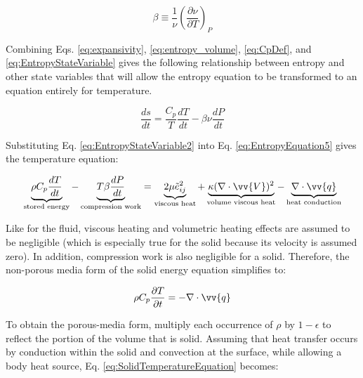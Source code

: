 \documentclass[10pt]{article}
\numberwithin{equation}{section} %
\begin{document}
\begin{equation}
\label{eq:expansivity}
\beta\equiv\frac{1}{\nu}\left(\frac{\partial \nu}{\partial T}\right)_P
\end{equation}

Combining Eqs. \eqref{eq:expansivity}, \eqref{eq:entropy_volume}, \eqref{eq:CpDef}, and \eqref{eq:EntropyStateVariable} gives the following relationship between entropy and other state variables that will allow the entropy equation to be transformed to an equation entirely for temperature.

\begin{equation}
\label{eq:EntropyStateVariable2}
\frac{ds}{dt}=\frac{C_p}{T}\frac{dT}{dt}-\beta \nu\frac{dP}{dt}
\end{equation}

Substituting Eq. \eqref{eq:EntropyStateVariable2} into Eq. \eqref{eq:EntropyEquation5} gives the temperature equation:

\begin{equation}
\label{eq:TemperatureEquation}
\begin{aligned}
\underbrace{\rho C_p\frac{dT}{dt}}_\text{stored energy}-\underbrace{T\beta\frac{dP}{dt}}_\text{compression work}=\underbrace{2\mu \tilde{e}_{ij}^2}_\text{viscous heat}+\underbrace{\kappa(\nabla\cdot\vv{V})^2}_\text{volume viscous heat}-\underbrace{\nabla\cdot\vv{q}}_\text{heat conduction}\\
\end{aligned}
\end{equation}

Like for the fluid, viscous heating and volumetric heating effects are assumed to be negligible (which is especially true for the solid because its velocity is assumed zero). In addition, compression work is also negligible for a solid. Therefore, the non-porous media form of the solid energy equation simplifies to:

\begin{equation}
\label{eq:SolidTemperatureEquation}
\rho C_p\frac{\partial T}{\partial t}=-\nabla\cdot\vv{q}\\
\end{equation}

To obtain the porous-media form, multiply each occurrence of \(\rho\) by \(1-\epsilon\) to reflect the portion of the volume that is solid. Assuming that heat transfer occurs by conduction within the solid and convection at the surface, while allowing a body heat source, Eq. \eqref{eq:SolidTemperatureEquation} becomes:
\end{document}
